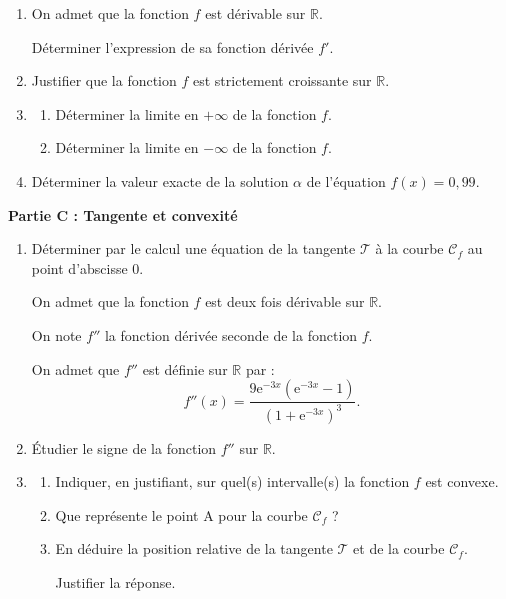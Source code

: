 \documentclass[10pt]{article}
\providecommand{\R}{\mathbb{R}}
\begin{document}
\begin{enumerate}
\item On admet que la fonction $f$ est dérivable sur $\R$.

Déterminer l'expression de sa fonction dérivée $f'$.
\item Justifier que la fonction $f$ est strictement croissante sur $\R$.
\item
	\begin{enumerate}
		\item Déterminer la limite en $+ \infty$ de la fonction $f$.
		\item Déterminer la limite en $- \infty$ de la fonction $f$.
	\end{enumerate}
\item Déterminer la valeur exacte de la solution $\alpha$ de l'équation $f(x) = 0,99$.
\end{enumerate}

\bigskip

\textbf{Partie C : Tangente et convexité}

\medskip

\begin{enumerate}
\item Déterminer par le calcul une équation de la tangente $\mathcal{T}$ à la courbe $\mathcal{C}_f$ au point d'abscisse $0$.

On admet que la fonction $f$ est deux fois dérivable sur $\R$. 

On note $f''$ la fonction dérivée seconde de la fonction $f$.

On admet que $f''$ est définie sur $\R$ par :
\[f''(x) = \dfrac{9\text{e}^{-3x} \left(\text{e}^{-3x} - 1\right)}{\left(1 + \text{e}^{-3x} \right)^3}.\]

\item Étudier le signe de la fonction $f''$ sur $\R$.
\item 
	\begin{enumerate}
		\item Indiquer, en justifiant, sur quel(s) intervalle(s) la fonction $f$ est convexe.
		\item Que représente le point A pour la courbe $\mathcal{C}_f$ ?
\item  En déduire la position relative de la tangente $\mathcal{T}$ et de la courbe $\mathcal{C}_f$.

Justifier la réponse.
	\end{enumerate}
\end{enumerate}

\medskip
\end{document}
